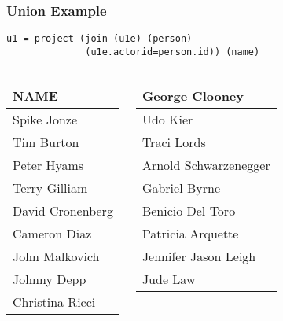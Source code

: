 \documentclass[dvipsnames]{beamer}
\theoremstyle{plain}
\begin{document}
\begin{frame}[fragile]
  \frametitle{Union Example}

  \begin{example}
    \begin{lstlisting}
u1 = project (join (u1e) (person)
              (u1e.actorid=person.id)) (name)
    \end{lstlisting}

    \pause
    \begin{columns}[b]
      \begin{tiny}
      \begin{table}
        \begin{tabular}{|l|}\hline
NAME                 \\\hline\hline
Spike Jonze          \\\hline
Tim Burton           \\\hline
Peter Hyams          \\\hline
Terry Gilliam        \\\hline
David Cronenberg     \\\hline
Cameron Diaz         \\\hline
John Malkovich       \\\hline
Johnny Depp          \\\hline
Christina Ricci      \\\hline
        \end{tabular}
      \end{table}
      \end{tiny}

      \begin{tiny}
      \begin{table}
        \begin{tabular}{|l|}\hline
George Clooney       \\\hline
Udo Kier             \\\hline
Traci Lords          \\\hline
Arnold Schwarzenegger\\\hline
Gabriel Byrne        \\\hline
Benicio Del Toro     \\\hline
Patricia Arquette    \\\hline
Jennifer Jason Leigh \\\hline
Jude Law             \\\hline
        \end{tabular}
      \end{table}
      \end{tiny}
    \end{columns}
  \end{example}
\end{frame}
\end{document}
